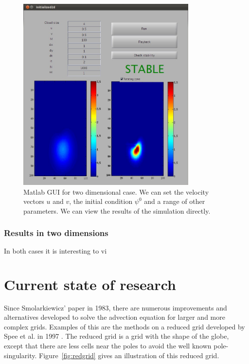 \documentclass[10pt, a4paper]{article}
\begin{document}
\begin{figure}
\centering
 \includegraphics[width=0.8\textwidth]{2dscreenshot.jpg}
 \caption{Matlab GUI for two dimensional case. We can set the velocity vectors $u$ and $v$, the initial condition $\psi^0$ and a range of other parameters. We can view the results of the simulation directly.}
 \label{fig:2dgui}
\end{figure}

\subsubsection{Results in two dimensions}

In both cases it is interesting to vi

\section{Current state of research}
Since Smolarkiewicz' paper in 1983, there are numerous improvements and alternatives developed to solve the advection equation for larger and more complex grids. Examples of this are the methods on a reduced grid developed by Spee et al. in 1997 \cite{spee}. The reduced grid is a grid with the shape of the globe, except that there are less cells near the poles to avoid the well known pole-singularity. Figure~\ref{fig:redgrid} gives an illustration of this reduced grid.
\end{document}

